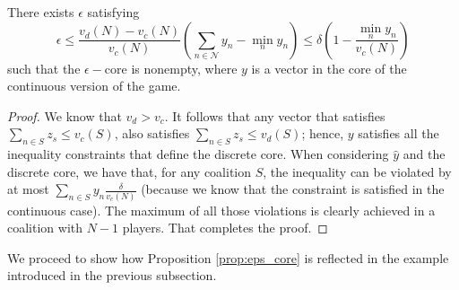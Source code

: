 \begin{proposition}\label{prop:eps_core}
  There exists $\epsilon$ satisfying
  $$\epsilon \leq \frac{v_d(N) - v_c(N)}{v_c(N)}\left( \sum_{n\in\mathcal{N}} y_n - \min_n{y_n}\right) \leq \delta\left( 1 - \frac{\min_n y_n}{v_c(N)} \right)   $$
  such that the $\epsilon-$core is nonempty, where $y$ is a vector in the core of the continuous version of the game.
\end{proposition}

\begin{proof}
We know that $v_d > v_c$. It follows that any vector that satisfies $\sum_{n \in S} z_s \leq v_c(S)$, also satisfies $\sum_{n \in S} z_s \leq v_d(S)$; hence, $y$ satisfies all the inequality constraints that define the discrete core. 
When considering $\hat{y}$ and the discrete core, we have that, for any coalition $S$, the inequality can be violated by at most $\sum_{n \in S} y_n\frac{\delta}{v_c(N)}$ (because we know that the constraint is satisfied in the continuous case). The maximum of all those violations is clearly achieved in a coalition with $N-1$ players. That completes the proof.
\end{proof}

We proceed to show how Proposition \ref{prop:eps_core} is reflected in the example introduced in the previous subsection.

